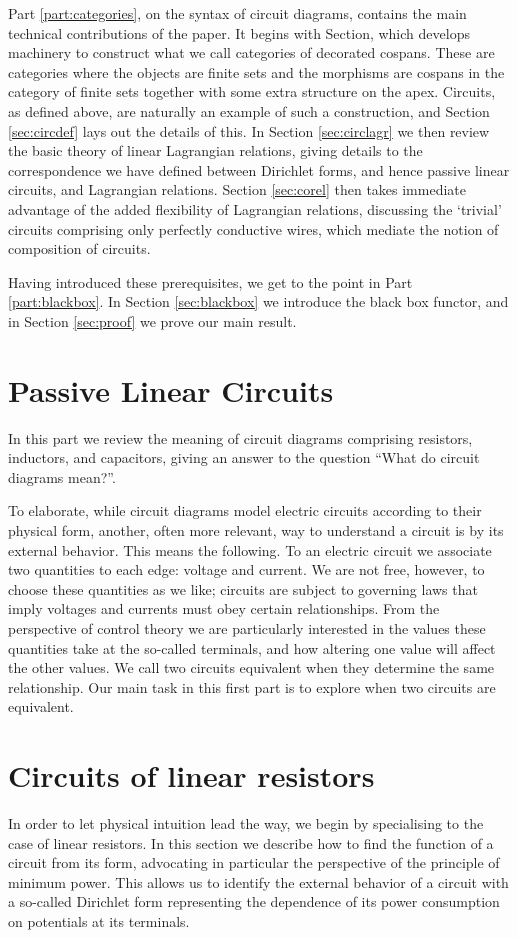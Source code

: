 Part \ref{part:categories}, on the syntax of circuit diagrams, contains the main
technical contributions of the paper. It begins with Section,
which develops machinery to construct what we call categories of decorated
cospans. These are categories where the objects are finite sets and the morphisms
are cospans in the category of finite sets together with some extra structure on
the apex. Circuits, as defined above, are naturally an example of such a
construction, and Section \ref{sec:circdef} lays out the details of this.
In Section \ref{sec:circlagr} we then review the basic theory of linear
Lagrangian relations, giving details to the correspondence we have defined
between Dirichlet forms, and hence passive linear circuits, and Lagrangian
relations. Section \ref{sec:corel} then takes immediate advantage of the added
flexibility of Lagrangian relations, discussing the `trivial' circuits
comprising only perfectly conductive wires, which mediate the notion of composition
of circuits.

Having introduced these prerequisites, we get to the point in Part \ref{part:blackbox}.
In Section \ref{sec:blackbox} we introduce the black box functor,  and  in Section \ref{sec:proof} we prove our main result.

\section{Passive Linear Circuits} \label{part:circuits}
In this part we review the meaning of circuit diagrams comprising resistors,
inductors, and capacitors, giving an answer to the question ``What do circuit
diagrams mean?''. 

To elaborate, while circuit diagrams model electric circuits according to their
physical form, another, often more relevant, way to understand a circuit is by
its external behavior. This means the following. To an electric circuit we
associate two quantities to each edge: voltage and current. We are not free,
however, to choose these quantities as we like; circuits are subject to
governing laws that imply voltages and currents must obey certain relationships.
From the perspective of control theory we are particularly interested in the
values these quantities take at the so-called terminals, and how altering one
value will affect the other values. We call two circuits equivalent when they
determine the same relationship. Our main task in this first part is to explore
when two circuits are equivalent.

\section{Circuits of linear resistors} \label{sec:resistors}
In order to let physical intuition lead the way, we begin by specialising to the
case of linear resistors. In this section we describe how to find the function
of a circuit from its form, advocating in particular the perspective of the
principle of minimum power. This allows us to identify the external behavior of a
circuit with a so-called Dirichlet form representing the dependence of its power
consumption on potentials at its terminals.


